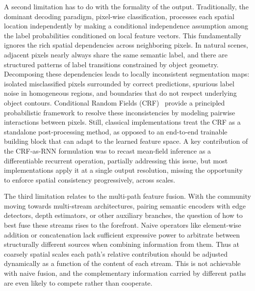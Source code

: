 \documentclass[conference]{IEEEtran}
\begin{document}
A second limitation has to do with the formality of the output. Traditionally, the dominant decoding
paradigm, pixel-wise classification, processes each spatial location independently by making a conditional
independence assumption among the label probabilities conditioned on local feature vectors. This
fundamentally ignores the rich spatial dependencies across neighboring pixels. In natural scenes, adjacent
pixels nearly always share the same semantic label, and there are structured patterns of label transitions
constrained by object geometry. Decomposing these dependencies leads to locally inconsistent
segmentation maps: isolated misclassified pixels surrounded by correct predictions, spurious label noise
in homogeneous regions, and boundaries that do not respect underlying object contours. Conditional
Random Fields (CRF)~\cite{sutton2012crf} provide a principled probabilistic framework to resolve these inconsistencies
by modeling pairwise interactions between pixels. Still, classical implementations treat the CRF as a
standalone post-processing method, as opposed to an end-to-end trainable building block that can adapt to
the learned feature space. A key contribution of the CRF-as-RNN formulation was to recast mean-field
inference as a differentiable recurrent operation, partially addressing this issue, but most implementations
apply it at a single output resolution, missing the opportunity to enforce spatial consistency progressively,
across scales.

The third limitation relates to the multi-path feature fusion. With the community moving towards multi-stream architectures, pairing semantic encoders with edge detectors, depth estimators, or other auxiliary
branches, the question of how to best fuse these streams rises to the forefront. Naive operators like
element-wise addition or concatenation lack sufficient expressive power to arbitrate between structurally
different sources when combining information from them. Thus at coarsely spatial scales each path's
relative contribution should be adjusted dynamically as a function of the content of each stream. This is
not achievable with naive fusion, and the complementary information carried by different paths are even
likely to compete rather than cooperate.
\end{document}
